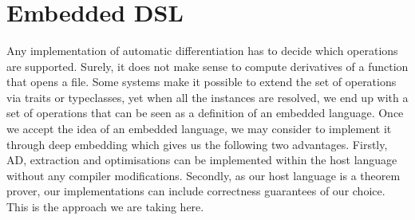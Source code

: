 \begin{code}[hide]%
\>[0]\AgdaSymbol{\{-\#}\AgdaSpace{}%
%
\>[13]\AgdaSpace{}%
\AgdaSymbol{\#-\}}\<%
\\
\>[0]\AgdaSpace{}%
\AgdaSpace{}%
\<%
\\
\>[0]\AgdaSpace{}%
\AgdaSpace{}%
\<%
\\
\>[0]\AgdaSpace{}%
\AgdaSpace{}%
\AgdaSpace{}%
\AgdaSpace{}%
\AgdaSymbol{(}\AgdaSymbol{;}\AgdaSpace{}%
\AgdaInductiveConstructor{[]}\AgdaSymbol{;}\AgdaSpace{}%
\AgdaSymbol{)}\<%
\\
\>[0]\AgdaSpace{}%
\AgdaSpace{}%
\AgdaSpace{}%
\AgdaSpace{}%
\AgdaSymbol{(}\AgdaSymbol{;}\AgdaSpace{}%
\AgdaSymbol{;}\AgdaSpace{}%
\AgdaSymbol{)}\<%
\\
\>[0]\AgdaSpace{}%
\AgdaSpace{}%
\<%
\\
\>[0]\<%
\\
%
\\[\AgdaEmptyExtraSkip]%
\>[0]\<%
\\
\>[0]\AgdaSpace{}%
\AgdaSpace{}%
\<%
\\
\>[0]\AgdaSpace{}%
\AgdaModule{\AgdaUnderscore{}}\AgdaSpace{}%
\<%
\end{code}
\section{Embedded DSL \label{sec:edsl}}

Any implementation of automatic differentiation has to decide which operations
are supported.  Surely, it does not make sense to compute derivatives
of a function that opens a file.  Some systems make it possible to extend
the set of operations via traits or typeclasses, yet when all the instances
are resolved, we end up with a set of operations that
can be seen as a definition of an embedded language.
Once we accept the idea of an embedded language, we may consider to implement
it through deep embedding which gives us the following two advantages.
Firstly, AD, extraction and optimisations can be implemented within the
host language without any compiler modifications.  Secondly, as our host
language is a theorem prover, our implementations can include correctness
guarantees of our choice.  This is the approach we are taking here.

